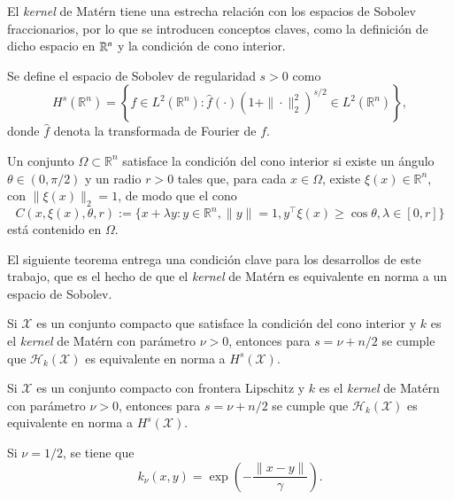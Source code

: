 El \textit{kernel} de Matérn tiene una estrecha relación con los espacios de Sobolev fraccionarios, por lo que se introducen conceptos claves, como la definición de dicho espacio en $\mathbb{R}^n$ y la condición de cono interior.

\begin{defn} Se define el espacio de Sobolev de regularidad $s > 0$ como
\[
H^s(\mathbb{R}^n) = \left\{ f \in L^2(\mathbb{R}^n) : \widehat{f}(\cdot)(1 + \|\cdot\|_2^2)^{s/2} \in L^2(\mathbb{R}^n) \right\},
\]
donde \( \widehat{f} \) denota la transformada de Fourier de \( f \).
\label{def:frac_sob}
\end{defn}

\begin{defn}
Un conjunto \( \Omega \subset \mathbb{R}^n \) satisface la condición del cono interior si existe un ángulo \( \theta \in (0, \pi/2) \) y un radio \( r > 0 \) tales que, para cada \( x \in \Omega \), existe \( \xi(x) \in \mathbb{R}^n \), con \( \|\xi(x)\|_2 = 1 \), de modo que el cono
\[
C(x, \xi(x), \theta, r) := \{x + \lambda y : y \in \mathbb{R}^n, \|y\| = 1, y^\top \xi(x) \geq \cos \theta, \lambda \in [0, r]\}
\]
está contenido en \( \Omega \).
\end{defn}
El siguiente teorema entrega una condición clave para los desarrollos de este trabajo, que es el hecho de que el \textit{kernel} de Matérn es equivalente en norma a un espacio de Sobolev.
\begin{teo}
Si \( \mathcal{X} \) es un conjunto compacto que satisface la condición del cono interior y \( k \) es el \textit{kernel} de Matérn con parámetro \( \nu > 0 \), entonces para \( s = \nu + n/2 \) se cumple que \( \mathcal{H}_k (\mathcal{X}) \) es equivalente en norma a \( H^s (\mathcal{X}) \).
\end{teo}

\begin{cor}
    Si \( \mathcal{X} \) es un conjunto compacto con frontera Lipschitz y \( k \) es el \textit{kernel} de Matérn con parámetro \( \nu > 0 \), entonces para \( s = \nu + n/2 \) se cumple que \( \mathcal{H}_k (\mathcal{X}) \) es equivalente en norma a \( H^s (\mathcal{X}) \).
\end{cor}

\begin{prop}
    Si $\nu = 1/2$, se tiene que
    \[
    k_\nu (x, y) = \exp \left( -\frac{\|x-y\|}{\gamma} \right).
    \]
\end{prop}


